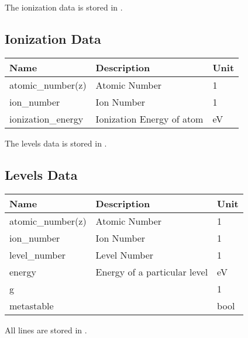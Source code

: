 \documentclass[letterpaper,10pt,english]{sphinxmanual}
\begin{document}
The ionization data is stored in .


\subsection{Ionization Data}
\label{atomic:ionization-data}
\begin{tabulary}{\linewidth}{|L|L|L|}
\hline
\textbf{
Name
} & \textbf{
Description
} & \textbf{
Unit
}\\\hline

atomic\_number(z)
 & 
Atomic Number
 & 
1
\\\hline

ion\_number
 & 
Ion Number
 & 
1
\\\hline

ionization\_energy
 & 
Ionization Energy of atom
 & 
eV
\\\hline
\end{tabulary}


The levels data is stored in .


\subsection{Levels Data}
\label{atomic:levels-data}
\begin{tabulary}{\linewidth}{|L|L|L|}
\hline
\textbf{
Name
} & \textbf{
Description
} & \textbf{
Unit
}\\\hline

atomic\_number(z)
 & 
Atomic Number
 & 
1
\\\hline

ion\_number
 & 
Ion Number
 & 
1
\\\hline

level\_number
 & 
Level Number
 & 
1
\\\hline

energy
 & 
Energy of a particular level
 & 
eV
\\\hline

g
 &  & 
1
\\\hline

metastable
 &  & 
bool
\\\hline
\end{tabulary}


All lines are stored in .
\end{document}
